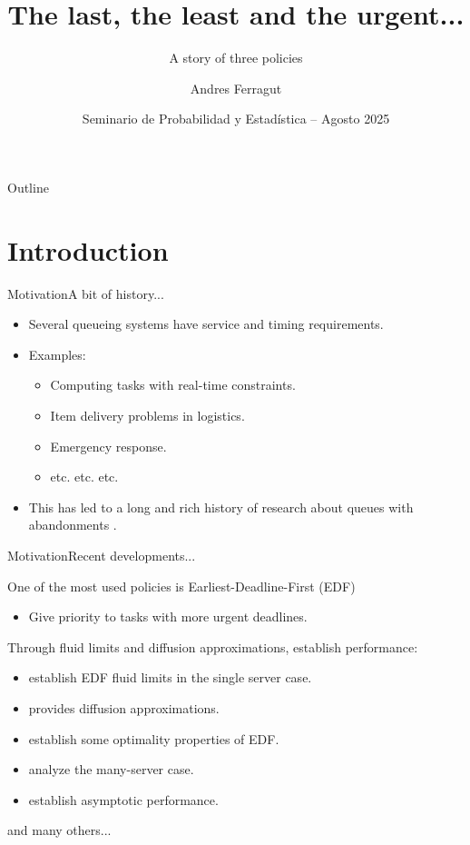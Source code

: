 \documentclass[aspectratio=169]{beamer}
\title{The last, the least and the urgent...}
\subtitle{A story of three policies}
\author[Andres Ferragut, Universidad ORT Uruguay]{Andres Ferragut}
\institute{con Diego Goldsztajn y Fernando Paganini}
\date[Seminario de Probabilidad y Estadística -- Agosto 2025]{Seminario de Probabilidad y Estadística -- Agosto 2025}
\renewcommand{\cite}{\citep}
\newenvironment*{myitem}[1][1.5em]{\begin{itemize}\setlength{\itemsep}{#1}}{\end{itemize}}
\begin{document}
\frame[plain]{\titlepage}

\begin{frame}{Outline}
\tableofcontents
\end{frame}

\section{Introduction}

\begin{frame}{Motivation}{A bit of history...}

	\begin{myitem}
		\item Several queueing systems have service and \alert{timing} requirements.
		\item Examples:
		\begin{itemize}
			\item Computing tasks with real-time constraints.
			\item Item delivery problems in logistics.
			\item Emergency response.
			\item etc. etc. etc.
		\end{itemize}
		\item This has led to a long and rich history of research about \alert{queues with abandonments} \cite{barrer1957queuing,stanford1979reneging,baccellietal1984single}.
	\end{myitem}

\end{frame}

\begin{frame}{Motivation}{Recent developments...}

	One of the most used policies is \alert{Earliest-Deadline-First (EDF)}
	\begin{itemize}
		\item Give priority to tasks with more urgent deadlines.
	\end{itemize}
	\vfill
	\pause
	
	Through fluid limits and diffusion approximations, establish performance:
	\begin{itemize}
		\item \cite{decreusefondmoyal2005fluid} establish EDF fluid limits in the single server case.
		\item \cite{kruketal2011heavy} provides diffusion approximations.
		\item \cite{moyal2013queues} establish some optimality properties of EDF.
		\item \cite{kangramanan2010fluid, kangramanan2012asymptotic} analyze the many-server case.
		\item \cite{ataretal2018law,ataretal2023long} establish asymptotic performance.
	\end{itemize}
	\vfill
	and many others...
\end{frame}
\end{document}
